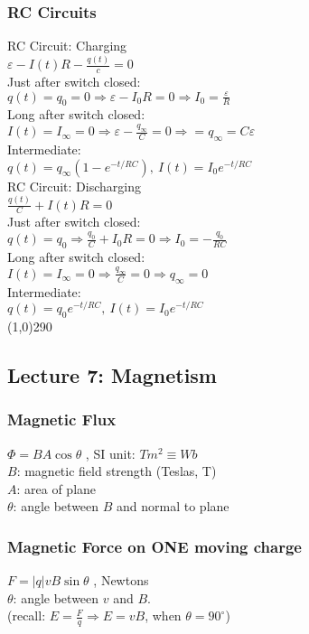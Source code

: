 \documentclass[10 pt]{article}
\begin{document}
\begin{multicols}{2}
\subsubsection*{RC Circuits}
\large RC Circuit: Charging \\
$\varepsilon - I(t)R - \frac{q(t)}{c} = 0$ \\
Just after switch closed: \\
$q(t) = q_{0} = 0 \Rightarrow \varepsilon - I_{0}R = 0 \Rightarrow I_{0} = \frac{\varepsilon}{R}$ \\
Long after switch closed: \\
$I(t) = I_{\infty} = 0 \Rightarrow \varepsilon - \frac{q_{\infty}}{C} = 0 \Rightarrow = q_{\infty} = C\varepsilon$ \\
Intermediate: \\
$q(t) = q_{\infty}(1-e^{-t/RC}),~I(t) = I_{0}e^{-t/RC}$ \\
\large RC Circuit: Discharging \\
$\frac{q(t)}{C} + I(t)R = 0$ \\
Just after switch closed: \\
$q(t) = q_{0} \Rightarrow \frac{q_{0}}{C} + I_{0}R = 0 \Rightarrow I_{0} = - \frac{q_{0}}{RC}$ \\
Long after switch closed: \\
$I(t) = I_{\infty} = 0 \Rightarrow \frac{q_{\infty}}{C} = 0 \Rightarrow q_{\infty} = 0$ \\
Intermediate: \\
$q(t) = q_{0}e^{-t/RC}, ~ I(t) = I_{0}e^{-t/RC}$
\\
\line(1,0){290}
\subsection*{Lecture 7: Magnetism}
\subsubsection*{Magnetic Flux}
$\Phi = BA \cos{\theta}$ , SI unit: $Tm^{2} \equiv Wb$ \\
$B$: magnetic field strength (Teslas, T) \\
$A$: area of plane \\
$\theta$: angle between $B$ and normal to plane

\subsubsection*{Magnetic Force on ONE moving charge}
$F = |q|vB\sin{\theta}$ , Newtons \\
$\theta$: angle between $v$ and $B$. \\
(recall: $E=\frac{F}{q} \Rightarrow E = vB$, when $\theta=90^\circ$)


\end{multicols}
\end{document}
